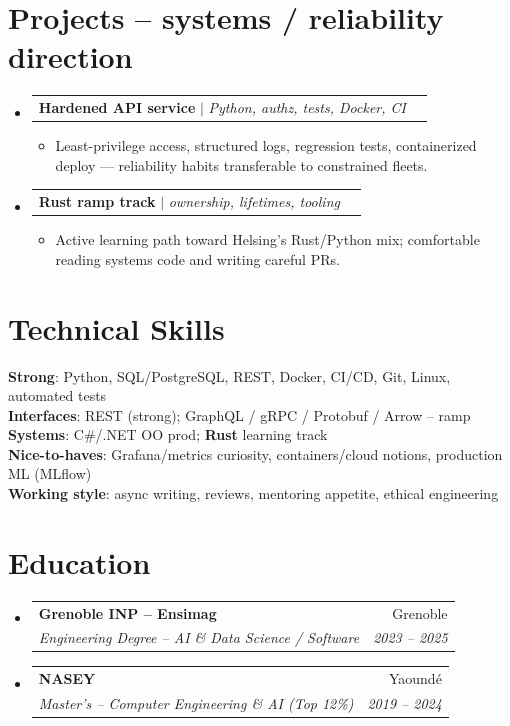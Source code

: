 \documentclass[letterpaper,10.5pt]{article}
\makeatletter
\newcommand{\resumeItem}[1]{\item\small{#1}}
\newcommand{\resumeSubheading}[4]{\vspace{2.5pt}\item\begin{tabular*}{0.97\textwidth}[t]{l@{\extracolsep{\fill}}r}\textbf{#1}&{#2}\\\textit{\small #3}&\textit{\small #4}\\\end{tabular*}\vspace{1pt}}
\newcommand{\resumeProjectHeading}[2]{\vspace{1.5pt}\item\begin{tabular*}{0.97\textwidth}{l@{\extracolsep{\fill}}r}\small #1&#2\\\end{tabular*}\vspace{1pt}}
\newcommand{\resumeSubHeadingListStart}{\begin{itemize}[leftmargin=0.08in,label={}]}
\newcommand{\resumeSubHeadingListEnd}{\end{itemize}}
\makeatother
\begin{document}
\section{Projects -- systems / reliability direction}
\resumeSubHeadingListStart
  \resumeProjectHeading{\textbf{Hardened API service} $|$ \emph{Python, authz, tests, Docker, CI}}{}
  \begin{itemize}\resumeItem{Least-privilege access, structured logs, regression tests, containerized deploy --- reliability habits transferable to constrained fleets.}\end{itemize}
  \resumeProjectHeading{\textbf{Rust ramp track} $|$ \emph{ownership, lifetimes, tooling}}{}
  \begin{itemize}\resumeItem{Active learning path toward Helsing's Rust/Python mix; comfortable reading systems code and writing careful PRs.}\end{itemize}
\resumeSubHeadingListEnd

\section{Technical Skills}
\begin{itemize}[leftmargin=0.08in,label={}]\small{\item{
\textbf{Strong}: Python, SQL/PostgreSQL, REST, Docker, CI/CD, Git, Linux, automated tests \\
\textbf{Interfaces}: REST (strong); GraphQL / gRPC / Protobuf / Arrow -- ramp \\
\textbf{Systems}: C\#/.NET OO prod; \textbf{Rust} learning track \\
\textbf{Nice-to-haves}: Grafana/metrics curiosity, containers/cloud notions, production ML (MLflow) \\
\textbf{Working style}: async writing, reviews, mentoring appetite, ethical engineering
}}\end{itemize}

\section{Education}
\resumeSubHeadingListStart
  \resumeSubheading{Grenoble INP -- Ensimag}{Grenoble}{Engineering Degree -- AI \& Data Science / Software}{2023 -- 2025}
  \resumeSubheading{NASEY}{Yaound\'e}{Master's -- Computer Engineering \& AI (Top 12\%)}{2019 -- 2024}
\resumeSubHeadingListEnd
\end{document}
